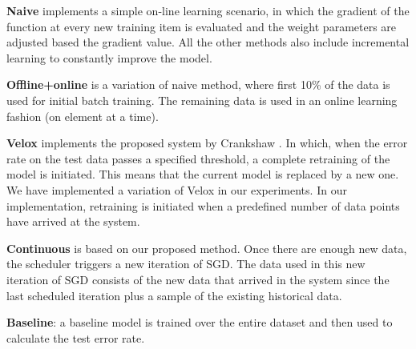 \documentclass{sig-alternate-05-2015}
\begin{document}
\textbf{Naive} implements a simple on-line learning scenario, in which the gradient of the function at every new training item is evaluated and the weight parameters are adjusted based the gradient value. 
All the other methods also include incremental learning to constantly improve the model.

\textbf{Offline+online} is a variation of naive method, where first 10\% of the data is used for initial batch training.
The remaining data is used in an online learning fashion (on element at a time). 

\textbf{Velox} implements the proposed system by Crankshaw \cite{crankshaw2014missing}. 
In which, when the error rate on the test data passes a specified threshold, a complete retraining of the model is initiated. 
This means that the current model is replaced by a new one. 
We have implemented a variation of Velox in our experiments. 
In our implementation, retraining is initiated when a predefined number of data points have arrived at the system. 

\textbf{Continuous} is based on our proposed method. 
Once there are enough new data, the scheduler triggers a new iteration of SGD. 
The data used in this new iteration of SGD consists of the new data that arrived in the system since the last scheduled iteration plus a sample of the existing historical data.

\textbf{Baseline}: a baseline model is trained over the entire dataset and then used to calculate the test error rate. 
\end{document}
